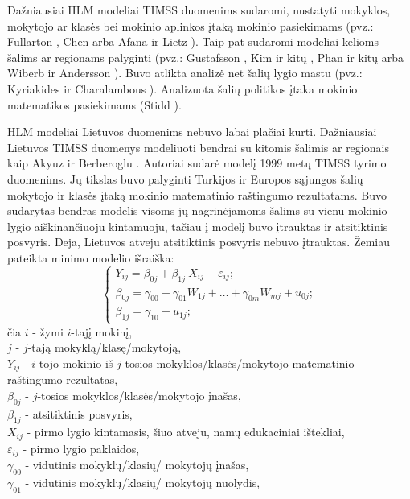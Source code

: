 \documentclass[11pt,a4paper]{article}
\begin{document}
\indent Dažniausiai HLM modeliai TIMSS duomenims sudaromi, nustatyti mokyklos, mokytojo ar klasės bei mokinio aplinkos įtaką mokinio pasiekimams (pvz.: Fullarton \cite{timssSch1}, Chen \cite{timssSchool2} arba Afana ir Lietz \cite{timssCpalyg1}). Taip pat sudaromi modeliai kelioms šalims ar regionams palyginti (pvz.: Gustafsson \cite{timssCpalyg}, Kim ir kitų \cite{timssCpalyg2}, Phan ir kitų \cite{timssCpalyg3} arba Wiberb ir Andersson \cite{timssCpalyg4}). Buvo atlikta analizė net šalių lygio mastu (pvz.: Kyriakides ir Charalambous \cite{countryHLM}). Analizuota šalių politikos įtaka mokinio matematikos pasiekimams (Stidd \cite{timssPol}).

\indent HLM modeliai Lietuvos duomenims nebuvo labai plačiai kurti. Dažniausiai Lietuvos TIMSS duomenys modeliuoti bendrai su kitomis šalimis ar regionais kaip Akyuz ir Berberoglu \cite{2007All}. Autoriai sudarė modelį 1999 metų TIMSS tyrimo duomenims. Jų tikslas buvo palyginti Turkijos ir Europos sąjungos šalių mokytojo ir klasės įtaką mokinio matematinio raštingumo rezultatams. Buvo sudarytas bendras modelis visoms jų nagrinėjamoms šalims su vienu mokinio lygio aiškinančiuoju kintamuoju, tačiau į modelį buvo įtrauktas ir atsitiktinis posvyris. Deja, Lietuvos atveju atsitiktinis posvyris nebuvo įtrauktas. Žemiau pateikta minimo modelio išraiška:
\[ \left\{
\begin{array}{l}
Y_{ij} = \beta_{0j}+\beta_{1j}\ X_{ij}+\varepsilon_{ij}; \\
\beta_{0j} = \gamma_{00} + \gamma_{01} W_{1j}+\dots+\gamma_{0m} W_{mj}+u_{0j};\\
\beta_{1j} = \gamma_{10} + u_{1j};
\end{array} \right.
\]
\small
čia $i$ - žymi $i$-tajį mokinį,\\
$j$ - $j$-tają mokyklą/klasę/mokytoją,\\
$Y_{ij}$ - $i$-tojo mokinio iš $j$-tosios mokyklos/klasės/mokytojo matematinio raštingumo rezultatas,\\
$\beta_{0j}$ - $j$-tosios mokyklos/klasės/mokytojo įnašas,\\
$\beta_{1j}$ - atsitiktinis posvyris,\\
$X_{ij}$ - pirmo lygio kintamasis, šiuo atveju, namų edukaciniai ištekliai, \\
$\varepsilon_{ij}$ - pirmo lygio paklaidos,\\
$\gamma_{00}$ - vidutinis mokyklų/klasių/ mokytojų įnašas,\\
$\gamma_{01}$ - vidutinis mokyklų/klasių/ mokytojų nuolydis,\\
\end{document}
